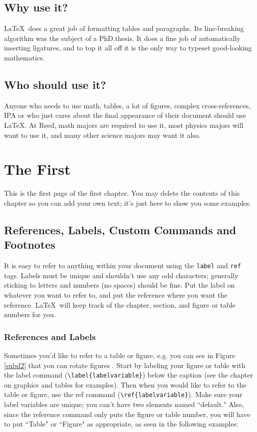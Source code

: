 \documentclass[
    12pt,
    twoside,
    bibstyle=ieee,
    headerstyle=uppercase
]{reedthesis}
\begin{document}
\section{Why use it?}
	
\LaTeX\ does a great job of formatting tables and paragraphs. Its line-breaking algorithm was the subject of a PhD.\thinspace thesis. It does a fine job of automatically inserting ligatures, and to top it all off it is the only way to typeset good-looking mathematics.

\section{Who should use it?}

Anyone who needs to use math, tables, a lot of figures, complex cross-references, IPA or who just cares about the final appearance of their document should use \LaTeX. At Reed, math majors are required to use it, most physics majors will want to use it, and many other science majors may want it also.
	
    \chapter{The First}
    	This is the first page of the first chapter. You may delete the contents of this chapter so you can add your own text; it's just here to show you some examples. 
	
\section{References, Labels, Custom Commands and Footnotes}
It is easy to refer to anything within your document using the \texttt{label} and \texttt{ref} tags.  Labels must be unique and shouldn't use any odd characters; generally sticking to letters and numbers (no spaces) should be fine. Put the label on whatever you want to refer to, and put the reference where you want the reference. \LaTeX\ will keep track of the chapter, section, and figure or table numbers for you. 

\subsection{References and Labels}
Sometimes you'd like to refer to a table or figure, e.g. you can see in Figure \ref{subd2} that you can rotate figures . Start by labeling your figure or table with the label command (\verb=\label{labelvariable}=) below the caption (see the chapter on graphics and tables for examples). Then when you would like to refer to the table or figure, use the ref command (\verb=\ref{labelvariable}=). Make sure your label variables are unique; you can't have two elements named ``default." Also, since the reference command only puts the figure or table number, you will have to put  ``Table" or ``Figure" as appropriate, as seen in the following examples:
\end{document}
